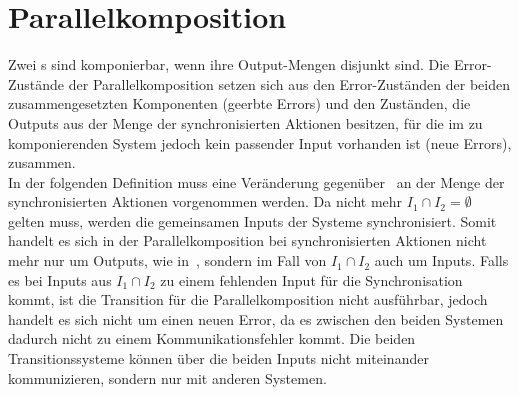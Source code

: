 \section{Parallelkomposition}
Zwei \EIO{}s sind komponierbar, wenn ihre Output-Mengen disjunkt sind. Die
Error-Zustän\-de der Parallelkomposition setzen sich aus den Error-Zuständen der
beiden zusammengesetzten Komponenten (geerbte Errors) und den Zuständen, die
Outputs aus der Menge der synchronisierten Aktionen besitzen, für die im zu
komponierenden System jedoch kein passender Input vorhanden ist (neue Errors),
zusammen.\\
In der folgenden Definition muss eine Veränderung
gegenüber~\cite{Vogler2014EIO} an der Menge der synchronisierten
Aktionen vorgenommen werden. Da nicht mehr $I_1\cap I_2 =\emptyset$ gelten
muss, werden die gemeinsamen Inputs der Systeme synchronisiert. Somit handelt es sich in
der Parallelkomposition bei synchronisierten Aktionen nicht mehr nur um
Outputs, wie in~\cite{Vogler2014EIO}, sondern im Fall von $I_1\cap I_2$ auch um
Inputs. Falls es bei Inputs aus $I_1\cap I_2$ zu einem fehlenden Input für die
Synchronisation kommt, ist die Transition für die Parallelkomposition nicht
ausführbar, jedoch handelt es sich nicht um einen neuen Error, da es
zwischen den beiden Systemen dadurch nicht zu einem Kommunikationsfehler
kommt. Die beiden Transitionssysteme können über die beiden Inputs nicht
miteinander kommunizieren, sondern nur mit anderen Systemen.

